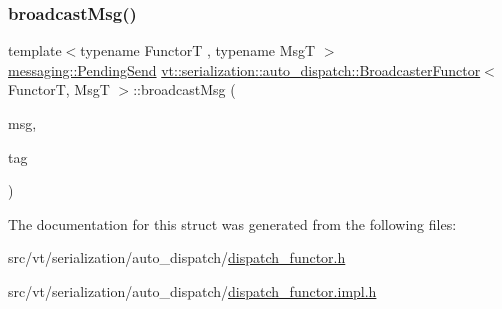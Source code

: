 \subsubsection{\texorpdfstring{broadcast\+Msg()}{broadcastMsg()}}
{\footnotesize\ttfamily template$<$typename FunctorT , typename MsgT $>$ \\
\hyperlink{structvt_1_1messaging_1_1_pending_send}{messaging\+::\+Pending\+Send} \hyperlink{structvt_1_1serialization_1_1auto__dispatch_1_1_broadcaster_functor}{vt\+::serialization\+::auto\+\_\+dispatch\+::\+Broadcaster\+Functor}$<$ FunctorT, MsgT $>$\+::broadcast\+Msg (\begin{DoxyParamCaption}\item[{MsgT $\ast$}]{msg,  }\item[{\hyperlink{namespacevt_a84ab281dae04a52a4b243d6bf62d0e52}{Tag\+Type} const \&}]{tag }\end{DoxyParamCaption})\hspace{0.3cm}{\ttfamily [static]}}



The documentation for this struct was generated from the following files\+:\begin{DoxyCompactItemize}
\item 
src/vt/serialization/auto\+\_\+dispatch/\hyperlink{dispatch__functor_8h}{dispatch\+\_\+functor.\+h}\item 
src/vt/serialization/auto\+\_\+dispatch/\hyperlink{dispatch__functor_8impl_8h}{dispatch\+\_\+functor.\+impl.\+h}\end{DoxyCompactItemize}
